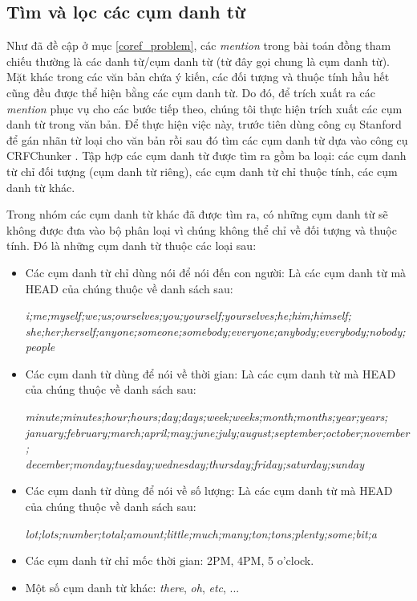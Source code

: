 \documentclass[12pt]{report}
\begin{document}
			\subsection*{Tìm và lọc các cụm danh từ}
				\par Như đã đề cập ở mục \ref{coref_problem}, các \textit{mention} trong bài toán đồng tham chiếu thường là các danh từ/cụm danh từ (từ đây gọi chung là cụm danh từ). Mặt khác trong các văn bản chứa ý kiến, các đối tượng và thuộc tính hầu hết cũng đều được thể hiện bằng các cụm danh từ. Do đó, để trích xuất ra các \textit{mention} phục vụ cho các bước tiếp theo, chúng tôi thực hiện trích xuất các cụm danh từ trong văn bản. Để thực hiện việc này, trước tiên dùng công cụ Stanford để gán nhãn từ loại cho văn bản rồi sau đó tìm các cụm danh từ dựa vào công cụ CRFChunker \cite{crfchunker}. Tập hợp các cụm danh từ được tìm ra gồm ba loại: các cụm danh từ chỉ đối tượng (cụm danh từ riêng), các cụm danh từ chỉ thuộc tính, các cụm danh từ khác.
				\par Trong nhóm các cụm danh từ khác đã được tìm ra, có những cụm danh từ sẽ không được đưa vào bộ phân loại vì chúng không thể chỉ về đối tượng và thuộc tính. Đó là những cụm danh từ thuộc các loại sau:
					\begin{itemize}
						\item{Các cụm danh từ chỉ dùng nói để nói đến con người: Là các cụm danh từ mà HEAD của chúng thuộc về danh sách sau:
						\par \textit{i;me;myself;we;us;ourselves;you;yourself;yourselves;he;him;himself;
						\\she;her;herself;anyone;someone;somebody;everyone;anybody;everybody;nobody;people}}
						\item{Các cụm danh từ dùng để nói về thời gian: Là các cụm danh từ mà HEAD của chúng thuộc về danh sách sau:
						\par \textit{minute;minutes;hour;hours;day;days;week;weeks;month;months;year;years;
						\\january;february;march;april;may;june;july;august;september;october;november;
						\\december;monday;tuesday;wednesday;thursday;friday;saturday;sunday}}
						\item{Các cụm danh từ dùng để nói về số lượng: Là các cụm danh từ mà HEAD của chúng thuộc về danh sách sau:
						\par \textit{lot;lots;number;total;amount;little;much;many;ton;tons;plenty;some;bit;a}}
						\item{Các cụm danh từ chỉ mốc thời gian: 2PM, 4PM, 5 o'clock.}
						\item{Một số cụm danh từ khác: \textit{there}, \textit{oh}, \textit{etc}, ...}					
					\end{itemize}
\end{document}
